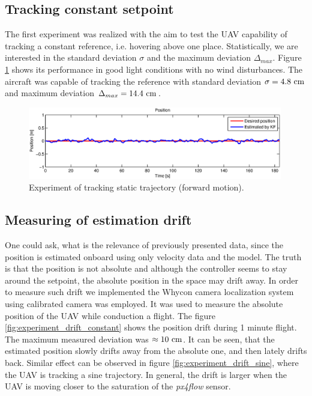 \subsection{Tracking constant setpoint}
\label{cap:tracking_constant_trajectory}

The first experiment was realized with the aim to test the UAV capability of tracking a constant reference, i.e. hovering above one place. Statistically, we are interested in the standard deviation $\sigma$ and the maximum deviation $\Delta_{max}$. Figure \ref{fig:experiment_constant_trajectory} shows its performance in good light conditions with no wind disturbances. The aircraft was capable of tracking the reference with standard deviation $\sigma = 4.8~\mathrm{cm}$ and maximum deviation $\Delta_{max} = 14.4~\mathrm{cm}$.

\begin{figure}[H]
\centering
\includegraphics[width=0.99\textwidth]{fig/experiment6_constant_reference.eps}
\caption{Experiment of tracking static trajectory (forward motion).}
\label{fig:experiment_constant_trajectory}
\end{figure}

\subsection{Measuring of estimation drift}

One could ask, what is the relevance of previously presented data, since the position is estimated onboard using only velocity data and the model. The truth is that the position is not absolute and although the controller seems to stay around the setpoint, the absolute position in the space may drift away. In order to measure such drift we implemented the Whycon camera localization system \citep{krajnik14JINT, faigl2013whycon} using calibrated camera was employed. It was used to measure the absolute position of the UAV while conduction a flight. The figure \ref{fig:experiment_drift_constant} shows the position drift during 1 minute flight. The maximum measured deviation was $\approx 10~\mathrm{cm}$. It can be seen, that the estimated position slowly drifts away from the absolute one, and then lately drifts back. Similar effect can be observed in figure \ref{fig:experiment_drift_sine}, where the UAV is tracking a sine trajectory. In general, the drift is larger when the UAV is moving closer to the saturation of the \emph{px4flow} sensor.

